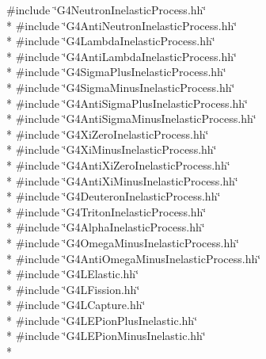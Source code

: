 {\ttfamily \#include \char`\"{}G4\-Neutron\-Inelastic\-Process.\-hh\char`\"{}}\\*
{\ttfamily \#include \char`\"{}G4\-Anti\-Neutron\-Inelastic\-Process.\-hh\char`\"{}}\\*
{\ttfamily \#include \char`\"{}G4\-Lambda\-Inelastic\-Process.\-hh\char`\"{}}\\*
{\ttfamily \#include \char`\"{}G4\-Anti\-Lambda\-Inelastic\-Process.\-hh\char`\"{}}\\*
{\ttfamily \#include \char`\"{}G4\-Sigma\-Plus\-Inelastic\-Process.\-hh\char`\"{}}\\*
{\ttfamily \#include \char`\"{}G4\-Sigma\-Minus\-Inelastic\-Process.\-hh\char`\"{}}\\*
{\ttfamily \#include \char`\"{}G4\-Anti\-Sigma\-Plus\-Inelastic\-Process.\-hh\char`\"{}}\\*
{\ttfamily \#include \char`\"{}G4\-Anti\-Sigma\-Minus\-Inelastic\-Process.\-hh\char`\"{}}\\*
{\ttfamily \#include \char`\"{}G4\-Xi\-Zero\-Inelastic\-Process.\-hh\char`\"{}}\\*
{\ttfamily \#include \char`\"{}G4\-Xi\-Minus\-Inelastic\-Process.\-hh\char`\"{}}\\*
{\ttfamily \#include \char`\"{}G4\-Anti\-Xi\-Zero\-Inelastic\-Process.\-hh\char`\"{}}\\*
{\ttfamily \#include \char`\"{}G4\-Anti\-Xi\-Minus\-Inelastic\-Process.\-hh\char`\"{}}\\*
{\ttfamily \#include \char`\"{}G4\-Deuteron\-Inelastic\-Process.\-hh\char`\"{}}\\*
{\ttfamily \#include \char`\"{}G4\-Triton\-Inelastic\-Process.\-hh\char`\"{}}\\*
{\ttfamily \#include \char`\"{}G4\-Alpha\-Inelastic\-Process.\-hh\char`\"{}}\\*
{\ttfamily \#include \char`\"{}G4\-Omega\-Minus\-Inelastic\-Process.\-hh\char`\"{}}\\*
{\ttfamily \#include \char`\"{}G4\-Anti\-Omega\-Minus\-Inelastic\-Process.\-hh\char`\"{}}\\*
{\ttfamily \#include \char`\"{}G4\-L\-Elastic.\-hh\char`\"{}}\\*
{\ttfamily \#include \char`\"{}G4\-L\-Fission.\-hh\char`\"{}}\\*
{\ttfamily \#include \char`\"{}G4\-L\-Capture.\-hh\char`\"{}}\\*
{\ttfamily \#include \char`\"{}G4\-L\-E\-Pion\-Plus\-Inelastic.\-hh\char`\"{}}\\*
{\ttfamily \#include \char`\"{}G4\-L\-E\-Pion\-Minus\-Inelastic.\-hh\char`\"{}}\\*
